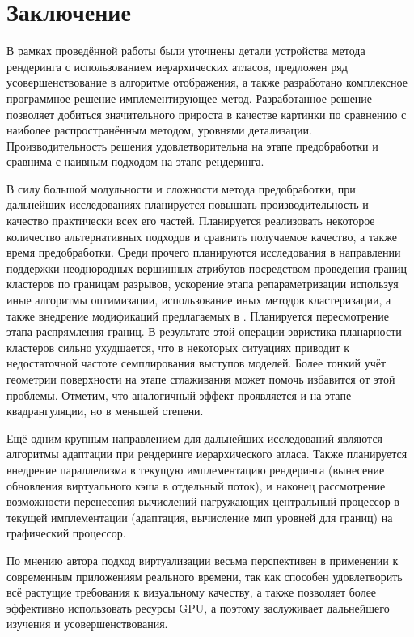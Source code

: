 
\section{Заключение}
В рамках проведённой работы были уточнены детали устройства метода рендеринга с использованием иерархических атласов, предложен ряд усовершенствование в алгоритме отображения, а также разработано комплексное программное решение имплементирующее метод. Разработанное решение позволяет добиться значительного прироста в качестве картинки по сравнению с наиболее распространённым методом, уровнями детализации. Производительность решения удовлетворительна на этапе предобработки и сравнима с наивным подходом на этапе рендеринга.

В силу большой модульности и сложности метода предобработки, при дальнейших исследованиях планируется повышать производительность и качество практически всех его частей. Планируется реализовать некоторое количество альтернативных подходов и сравнить получаемое качество, а также время предобработки. Среди прочего планируются исследования в направлении поддержки неоднородных вершинных атрибутов посредством проведения границ кластеров по границам разрывов, ускорение этапа репараметризации используя иные алгоритмы оптимизации, использование иных методов кластеризации, а также внедрение модификаций предлагаемых в \cite{feng2010feature}. Планируется пересмотрение этапа распрямления границ. В результате этой операции эвристика планарности кластеров сильно ухудшается, что в некоторых ситуациях приводит к недостаточной частоте семплирования выступов моделей. Более тонкий учёт геометрии поверхности на этапе сглаживания может помочь избавится от этой проблемы. Отметим, что аналогичный эффект проявляется и на этапе квадрангуляции, но в меньшей степени.

Ещё одним крупным направлением для дальнейших исследований являются алгоритмы адаптации при рендеринге иерархического атласа. Также планируется внедрение параллелизма в текущую имплементацию рендеринга (вынесение обновления виртуального кэша в отдельный поток), и наконец рассмотрение возможности перенесения вычислений нагружающих центральный процессор в текущей имплементации (адаптация, вычисление мип уровней для границ) на графический процессор.

По мнению автора подход виртуализации весьма перспективен в применении к современным приложениям реального времени, так как способен удовлетворить всё растущие требования к визуальному качеству, а также позволяет более эффективно использовать ресурсы GPU, а поэтому заслуживает дальнейшего изучения и усовершенствования.

